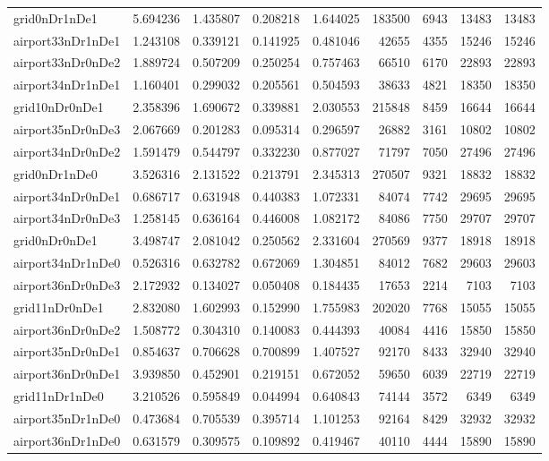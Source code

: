 \documentclass[../../../thesis.tex]{subfiles}
\begin{document}
\begin{longtable}{|l|r|r|r|r|r|r|r|r|}
grid0nDr1nDe1 & 5.694236 & 1.435807 & 0.208218 & 1.644025 & 183500 & 6943 & 13483 & 13483 \\
airport33nDr1nDe1 & 1.243108 & 0.339121 & 0.141925 & 0.481046 & 42655 & 4355 & 15246 & 15246 \\
airport33nDr0nDe2 & 1.889724 & 0.507209 & 0.250254 & 0.757463 & 66510 & 6170 & 22893 & 22893 \\
airport34nDr1nDe1 & 1.160401 & 0.299032 & 0.205561 & 0.504593 & 38633 & 4821 & 18350 & 18350 \\
grid10nDr0nDe1 & 2.358396 & 1.690672 & 0.339881 & 2.030553 & 215848 & 8459 & 16644 & 16644 \\
airport35nDr0nDe3 & 2.067669 & 0.201283 & 0.095314 & 0.296597 & 26882 & 3161 & 10802 & 10802 \\
airport34nDr0nDe2 & 1.591479 & 0.544797 & 0.332230 & 0.877027 & 71797 & 7050 & 27496 & 27496 \\
grid0nDr1nDe0 & 3.526316 & 2.131522 & 0.213791 & 2.345313 & 270507 & 9321 & 18832 & 18832 \\
airport34nDr0nDe1 & 0.686717 & 0.631948 & 0.440383 & 1.072331 & 84074 & 7742 & 29695 & 29695 \\
airport34nDr0nDe3 & 1.258145 & 0.636164 & 0.446008 & 1.082172 & 84086 & 7750 & 29707 & 29707 \\
grid0nDr0nDe1 & 3.498747 & 2.081042 & 0.250562 & 2.331604 & 270569 & 9377 & 18918 & 18918 \\
airport34nDr1nDe0 & 0.526316 & 0.632782 & 0.672069 & 1.304851 & 84012 & 7682 & 29603 & 29603 \\
airport36nDr0nDe3 & 2.172932 & 0.134027 & 0.050408 & 0.184435 & 17653 & 2214 & 7103 & 7103 \\
grid11nDr0nDe1 & 2.832080 & 1.602993 & 0.152990 & 1.755983 & 202020 & 7768 & 15055 & 15055 \\
airport36nDr0nDe2 & 1.508772 & 0.304310 & 0.140083 & 0.444393 & 40084 & 4416 & 15850 & 15850 \\
airport35nDr0nDe1 & 0.854637 & 0.706628 & 0.700899 & 1.407527 & 92170 & 8433 & 32940 & 32940 \\
airport36nDr0nDe1 & 3.939850 & 0.452901 & 0.219151 & 0.672052 & 59650 & 6039 & 22719 & 22719 \\
grid11nDr1nDe0 & 3.210526 & 0.595849 & 0.044994 & 0.640843 & 74144 & 3572 & 6349 & 6349 \\
airport35nDr1nDe0 & 0.473684 & 0.705539 & 0.395714 & 1.101253 & 92164 & 8429 & 32932 & 32932 \\
airport36nDr1nDe0 & 0.631579 & 0.309575 & 0.109892 & 0.419467 & 40110 & 4444 & 15890 & 15890 \\

\end{longtable}
\end{document}
